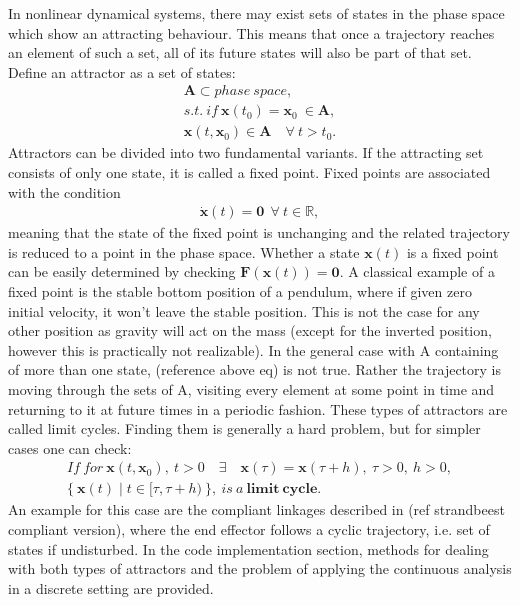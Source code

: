     In nonlinear dynamical systems, there may exist sets of states in the phase space which show an attracting behaviour. This means that once a trajectory reaches an element of such a set, all of its future states will also be part of that set. Define an attractor as a set of states:
    \begin{gather} \mathbf{A} \subset phase\ space,\\ s.t.\ if \ \mathbf{x}(t_0) = \mathbf{x}_0\ \in \mathbf{A}, \\ \mathbf{x}(t,\mathbf{x}_0) \in \mathbf{A}\quad \forall\ t > t_0. \label{eq:2} \end{gather}
    Attractors can be divided into two fundamental variants.
    If the attracting set consists of only one state, it is called a fixed point. Fixed points are associated with the condition
    \begin{gather}  \dot{\mathbf{x}}(t) = \mathbf{0}\ \ \forall \ t \in \mathbb{R}, \label{eq:3} \end{gather}
    meaning that the state of the fixed point is unchanging and the related trajectory is reduced to a point in the phase space. Whether a state $\mathbf{x}(t)$ is a fixed point can be easily determined by checking $\mathbf{F}(\mathbf{x}(t)) = \mathbf{0}$. A classical example of a fixed point is the stable bottom position of a pendulum, where if given zero initial velocity, it won't leave the stable position. This is not the case for any other position as gravity will act on the mass (except for the inverted position, however this is practically not realizable).
    In the general case with A containing of more than one state, (reference above eq) is not true. Rather the trajectory is moving through the sets of A, visiting every element at some point in time and returning to it at future times in a periodic fashion. These types of attractors are called limit cycles. Finding them is generally a hard problem, but for simpler cases one can check:
    \begin{gather} If\ for \ \mathbf{x}(t,\mathbf{x}_0) ,\ t > 0 \quad \exists \quad \mathbf{x}(\tau) = \mathbf{x}(\tau + h),\ \tau > 0,\ h > 0, \\ \{\ \mathbf{x}(t) \mid t \in [\tau,\tau + h)\ \}, \ is \ a\ \mathbf{limit\ cycle}.\label{eq:4} \end{gather}
    An example for this case are the compliant linkages described in (ref strandbeest compliant version), where the end effector follows a cyclic trajectory, i.e. set of states if undisturbed. 
    In the code implementation section, methods for dealing with both types of attractors and the problem of applying the continuous analysis in a discrete setting are provided. 

